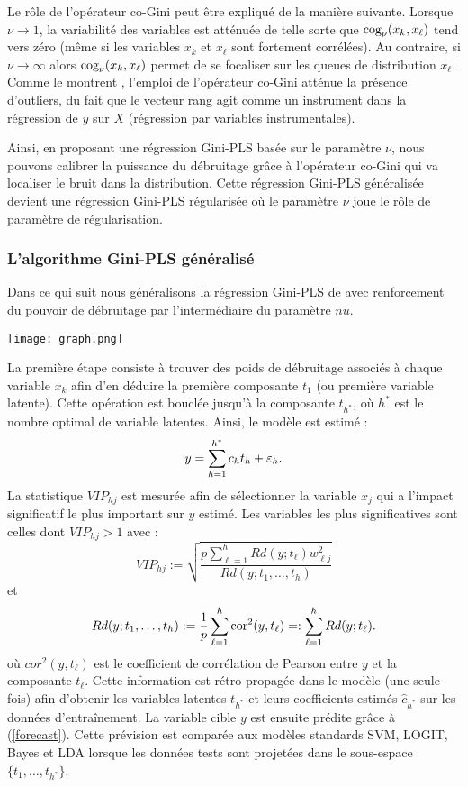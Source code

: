 Le rôle de l'opérateur co-Gini peut être expliqué de la manière suivante. Lorsque $\nu \rightarrow 1$, la variabilité des variables est atténuée de telle sorte que $\text{cog}_\nu(x_k,x_\ell)$ tend vers zéro (même si les variables $x_k$ et $x_\ell$ sont fortement corrélées). Au contraire, si $\nu \rightarrow \infty $ alors $\text{cog}_\nu(x_k,x_\ell)$ permet de se focaliser sur les queues de distribution $x_\ell$. Comme le montrent \citet{olkin1992gini}, l'emploi de l'opérateur co-Gini atténue la présence d'outliers, du fait que le vecteur rang agit comme un instrument dans la régression de $y$ sur $X$ (régression par variables instrumentales).    

Ainsi, en proposant une régression Gini-PLS basée sur le paramètre $\nu$, nous pouvons calibrer la puissance du débruitage  grâce à l'opérateur co-Gini qui va localiser le bruit dans la distribution. Cette régression Gini-PLS généralisée devient une régression Gini-PLS régularisée où le paramètre $\nu$ joue le rôle de paramètre de régularisation. 


\subsubsection{L'algorithme Gini-PLS généralisé} 

Dans ce qui suit nous généralisons la régression Gini-PLS de \citet{mussard2018ginipls} avec renforcement du pouvoir de débruitage par l'intermédiaire du paramètre $nu$.


\begin{center}
	\texttt{[image: graph.png]}
\end{center}


La première étape consiste à trouver des poids de débruitage associés à chaque variable $x_k$ afin d'en déduire la première composante $t_1$ (ou première variable latente). Cette opération est bouclée jusqu'à la composante $t_{h^*}$, où $h^*$ est le nombre optimal de variable latentes. Ainsi, le modèle est estimé :
\begin{equation}\label{forecast}
y=\sum_{h=1}^{h^*} c_ht_h +\varepsilon_h.
\end{equation}   
La statistique $VIP_{hj}$ est mesurée afin de sélectionner la variable $x_j$ qui a l'impact significatif le plus important sur $y$ estimé. Les variables les plus significatives sont celles dont $VIP_{hj}>1$ avec :
\[
VIP_{hj} := \sqrt{\frac{p\sum_{\ell=1}^{h}Rd(y;t_\ell)w_{\ell j}^2}{Rd(y;t_1,\ldots,t_h)}} 
\] 
et 
\[
Rd(y; t_1,\ldots,t_h) := \frac{1}{p}\sum_{\ell=1}^{h}\text{cor}^2(y,t_\ell) =: \sum_{\ell=1}^{h}Rd(y;t_\ell).
\]
où $cor^2(y,t_\ell)$ est le coefficient de corrélation de Pearson entre $y$ et la composante $t_\ell$. Cette information est rétro-propagée dans le modèle (une seule fois) afin d'obtenir les variables latentes $t_{h^*}$ et leurs coefficients estimés $\hat{c}_{h^*}$ sur les données d'entraînement. La variable cible $y$ est ensuite prédite grâce à (\ref{forecast}). Cette prévision est comparée aux modèles standards SVM, LOGIT, Bayes et LDA lorsque les données tests sont projetées dans le sous-espace $\{t_1,\ldots,t_{h^*}\}$.


